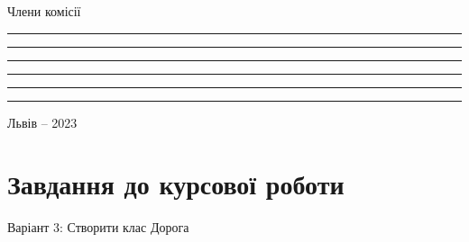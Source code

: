 \documentclass[14pt]{extarticle}
\begin{document}
\begin{titlepage}
\begin{center}
\begin{flushright}
            Члени комісії
            \rule{2.5cm  \space}{0.3pt} 
            \rule{7cm \space}{0.3pt} 

            \rule{2.5cm  \space}{0.3pt} 
            \rule{7cm \space}{0.3pt} 

            \rule{2.5cm  \space}{0.3pt} 
            \rule{7cm \space}{0.3pt} 
        \end{flushright}

        \vspace*{24pt}
        Львів -- 2023
            
            
    \end{center}
\end{titlepage}

\tableofcontents
\break


\section{Завдання до курсової роботи}

Варіант 3:
Створити клас Дорога
\end{document}

